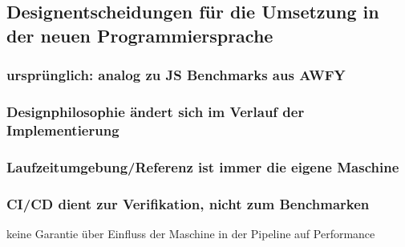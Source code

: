 \subsection{ Designentscheidungen für die Umsetzung in der neuen Programmiersprache }
\subsubsection{ ursprünglich: analog zu JS Benchmarks aus AWFY }
\subsubsection{ Designphilosophie ändert sich im Verlauf der Implementierung  }
\subsubsection{ Laufzeitumgebung/Referenz ist immer die eigene Maschine }
\subsubsection{CI/CD dient zur Verifikation, nicht zum Benchmarken  }
    {\rightarrow} keine Garantie über Einfluss der Maschine in der Pipeline auf Performance 
    